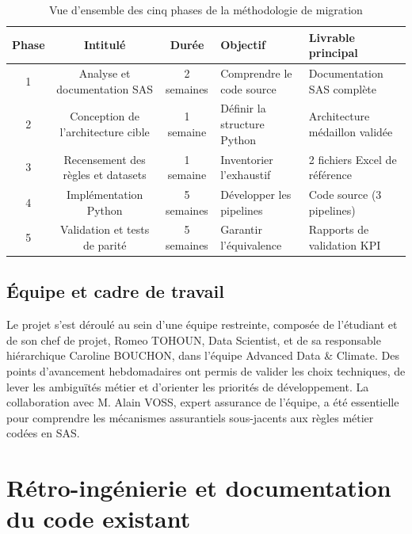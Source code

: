 \begin{table}[H]
    \centering
    \caption{Vue d'ensemble des cinq phases de la méthodologie de migration}
    \label{tab:methodologie}
    \vspace{0.2cm}
    \begin{tabularx}{\textwidth}{|c|c|c|X|X|}
        \hline
        \textbf{Phase} & \textbf{Intitulé} & \textbf{Durée} & \textbf{Objectif} & \textbf{Livrable principal} \\
        \hline
        1 & Analyse et documentation SAS & 2 semaines & Comprendre le code source & Documentation SAS complète \\
        \hline
        2 & Conception de l'architecture cible & 1 semaine & Définir la structure Python & Architecture médaillon validée \\
        \hline
        3 & Recensement des règles et datasets & 1 semaine & Inventorier l'exhaustif & 2 fichiers Excel de référence \\
        \hline
        4 & Implémentation Python & 5 semaines & Développer les pipelines & Code source (3 pipelines) \\
        \hline
        5 & Validation et tests de parité & 5 semaines & Garantir l'équivalence & Rapports de validation KPI \\
        \hline
    \end{tabularx}
\end{table}

\subsection{Équipe et cadre de travail}

Le projet s'est déroulé au sein d'une équipe restreinte, composée de l'étudiant et de son chef de projet, Romeo TOHOUN, Data Scientist, et de sa responsable hiérarchique Caroline BOUCHON, dans l'équipe Advanced Data \& Climate. Des points d'avancement hebdomadaires ont permis de valider les choix techniques, de lever les ambiguïtés métier et d'orienter les priorités de développement. La collaboration avec M. Alain VOSS, expert assurance de l'équipe, a été essentielle pour comprendre les mécanismes assurantiels sous-jacents aux règles métier codées en SAS.

\section{Rétro-ingénierie et documentation du code existant}

